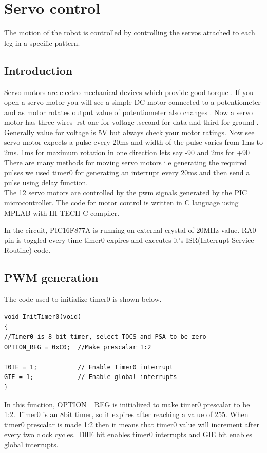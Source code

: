\documentclass{report}
\begin{document}
\section{Servo control}
The motion of the robot is controlled by controlling the servos attached to each leg in a specific pattern.
\subsection*{Introduction}
Servo motors are electro-mechanical devices which provide good torque . If you open a servo motor you will
see a simple DC motor connected to a potentiometer and as motor rotates output value of potentiometer
also changes . Now a servo motor has three wires rst one for voltage ,second for data and third for ground
. Generally value for voltage is 5V but always check your motor ratings. Now see servo motor expects a
pulse every 20ms and width of the pulse varies from 1ms to 2ms. 1ms for maximum rotation in one direction
lets say -90 and 2ms for +90\\
There are many methods for moving servo motors i.e generating the required pulses we used timer0 for generating an interrupt every 20ms and then send
a pulse using delay function.\\
The 12 servo motors are controlled by the pwm signals generated by the PIC microcontroller.
The  code for motor control is written in C language using MPLAB with HI-TECH C compiler. 

In the circuit, PIC16F877A is running on external crystal of 20MHz value. RA0 pin is toggled every time timer0 expires and executes it's ISR(Interrupt Service Routine) code.\\
\subsection*{PWM generation}
The code used to initialize timer0 is shown below.\\

\begin{lstlisting}[caption=Timer0 Initialisation]
void InitTimer0(void)
{
//Timer0 is 8 bit timer, select TOCS and PSA to be zero
OPTION_REG = 0xC0;	//Make prescalar 1:2

T0IE = 1;			// Enable Timer0 interrupt
GIE = 1;			// Enable global interrupts
}
\end{lstlisting}

In this function, OPTION\_ REG is initialized to make timer0 prescalar to be 1:2. Timer0 is an 8bit timer, so it expires after reaching a value of 255. When timer0 prescalar is made 1:2 then it means that timer0 value will increment after every two clock cycles. T0IE bit enables timer0 interrupts and GIE bit enables global interrupts.
\end{document}
